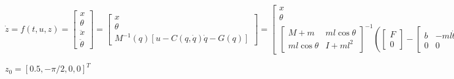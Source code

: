 \documentclass{article}
\begin{document}
$\dot{z}=f\left( t,u,z\right) =\left[ 
\begin{array}{c}
x \\ 
\theta  \\ 
\ddot{x} \\ 
\ddot{\theta}%
\end{array}%
\right] =\left[ 
\begin{array}{c}
x \\ 
\theta  \\ 
M^{-1}(q)\left[ u-C(q,\dot{q})\dot{q}-G(q)\right] 
\end{array}%
\right] =\left[ 
\begin{array}{c}
x \\ 
\theta  \\ 
\left[ 
\begin{array}{cc}
M+m & ml\cos \theta  \\ 
ml\cos \theta  & I+ml^{2}%
\end{array}%
\right] ^{-1}\left( \left[ 
\begin{array}{c}
F \\ 
0%
\end{array}%
\right] -\left[ 
\begin{array}{cc}
b & -ml\dot{\theta}\sin \theta  \\ 
0 & 0%
\end{array}%
\right] \left[ 
\begin{array}{c}
\dot{x} \\ 
\dot{\theta}%
\end{array}%
\right] -\left[ 
\begin{array}{c}
0 \\ 
mgl\sin \theta 
\end{array}%
\right] \right) 
\end{array}%
\right] $

$z_{0}=[0.5,-\pi /2,0,0]^{T}$
\end{document}
